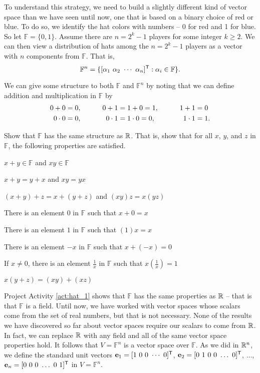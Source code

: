 To understand this strategy, we need to build a slightly different kind of vector space than we have seen until now, one that is based on a binary choice of red or blue. To do so, we identify the hat colors with numbers -- 0 for red and 1 for blue. So let $\mathbb{F} = \{0,1\}$. Assume there are $n = 2^k-1$ players for some integer $k \geq 2$. We can then view a distribution of hats among the $n = 2^k-1$ players as a vector with $n$ components from $\mathbb{F}$. That is,
\[\mathbb{F}^n = \{ [\alpha_1 \ \alpha_2 \ \cdots \ \alpha_n]^{\tr} : \alpha_i \in \mathbb{F}\}.\]

We can give some structure to both $\mathbb{F}$ and $\mathbb{F}^n$ by noting that we can define addition and multiplication in $\mathbb{F}$ by 
\begin{alignat*}{3}
0 + 0 &= 0,  	&\hspace{0.3in}		0 + 1 &= 1 + 0 = 1, &\hspace{0.3in}  1+1 &= 0 \\
 0 \cdot 0 &= 0,  &				0 \cdot 1 &= 1 \cdot 0 = 0, &	 1 \cdot 1 &= 1.
\end{alignat*}

\begin{pactivity} \label{act:hat_1} Show that $\mathbb{F}$ has the same structure as $\mathbb{R}$. That is, show that for all $x$, $y$, and $z$ in $\mathbb{F}$, the following properties are satisfied. 
	\ba
	\item $x + y \in \mathbb{F}$ and $xy \in \mathbb{F}$ 
	\item $x + y = y + x$ and $xy=yx$ 
	\item $(x + y) + z = x + (y + z)$ and $(xy)z = x(yz)$ 
	\item There is an element $0$ in $\mathbb{F}$ such that $x+ 0 = x$ 
	\item There is an element $1$ in $\mathbb{F}$ such that $(1)x = x$ 
	\item There is an element $-x$ in $\mathbb{F}$ such that $x+(-x) = 0$
	\item If $x \neq 0$, there is an element $\frac{1}{x}$ in $\mathbb{F}$ such that $x\left(\frac{1}{x}\right) = 1$
	\item $x (y + z) = (x y) + (x z)$ 
	\ea
	

\end{pactivity}


Project Activity \ref{act:hat_1} shows that $\mathbb{F}$ has the same properties as $\mathbb{R}$ -- that is that $\mathbb{F}$ is a field.  Until now, we have worked with vector spaces whose scalars come from the set of real numbers, but that is not necessary. None of the results we have discovered so far about vector spaces require our scalars to come from $\mathbb{R}$. In fact, we can replace $\mathbb{R}$ with any field and all of the same vector space properties hold. It follows that $V = \mathbb{F}^n$ is a vector space over $\mathbb{F}$. As we did in $\mathbb{R}^n$, we define the standard unit vectors $\ve_1 = [1 \ 0 \ 0 \ \cdots \ 0]^{\tr}$, $\mathbf{e}_2 = [0 \ 1 \ 0 \ 0 \ \ldots \ 0]^{\mathsf{T}}$, $\ldots$, $\ve_n = [0 \ 0 \ 0 \ \ldots \ 0 \ 1]^{\tr}$ in $V = \mathbb{F}^n$. 

